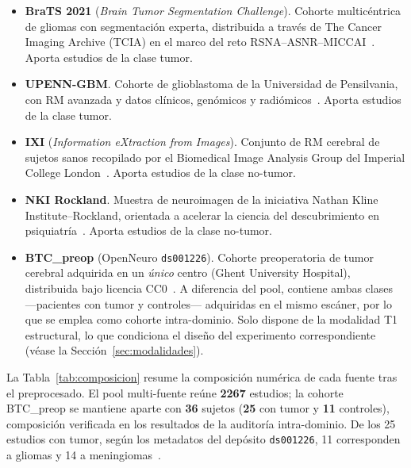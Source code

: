 \begin{itemize}
  \item \textbf{BraTS 2021} (\emph{Brain Tumor Segmentation Challenge}). Cohorte
  multicéntrica de gliomas con segmentación experta, distribuida a través de
  The Cancer Imaging Archive (TCIA) en el marco del reto
  RSNA--ASNR--MICCAI~\cite{baid2021brats,menze2015brats,bakas2017advancing,clark2013tcia}.
  Aporta estudios de la clase tumor.

  \item \textbf{UPENN-GBM}. Cohorte de glioblastoma de la Universidad de
  Pensilvania, con RM avanzada y datos clínicos, genómicos y
  radiómicos~\cite{bakas2022upenngbm}. Aporta estudios de la clase tumor.

  \item \textbf{IXI} (\emph{Information eXtraction from Images}). Conjunto de RM
  cerebral de sujetos sanos recopilado por el Biomedical Image Analysis Group
  del Imperial College London~\cite{ixi_dataset}. Aporta estudios de la clase
  no-tumor.

  \item \textbf{NKI Rockland}. Muestra de neuroimagen de la iniciativa
  Nathan Kline Institute--Rockland, orientada a acelerar la ciencia del
  descubrimiento en psiquiatría~\cite{nooner2012nki}. Aporta estudios de la
  clase no-tumor.

  \item \textbf{BTC\_preop} (OpenNeuro \texttt{ds001226}). Cohorte preoperatoria
  de tumor cerebral adquirida en un \emph{único} centro (Ghent University
  Hospital), distribuida bajo licencia CC0~\cite{aerts2022btcpreop}. A
  diferencia del pool, contiene ambas clases ---pacientes con tumor y
  controles--- adquiridas en el mismo escáner, por lo que se emplea como cohorte
  intra-dominio. Solo dispone de la modalidad T1 estructural, lo que condiciona
  el diseño del experimento correspondiente (véase la Sección~\ref{sec:modalidades}).
\end{itemize}

La Tabla~\ref{tab:composicion} resume la composición numérica de cada fuente
tras el preprocesado. El pool multi-fuente reúne \textbf{2267} estudios; la
cohorte BTC\_preop se mantiene aparte con \textbf{36} sujetos (\textbf{25} con
tumor y \textbf{11} controles), composición verificada en los resultados de la
auditoría intra-dominio. De los 25 estudios con tumor, según los metadatos del
depósito \texttt{ds001226}, 11 corresponden a gliomas y 14 a
meningiomas~\cite{aerts2022btcpreop}.

